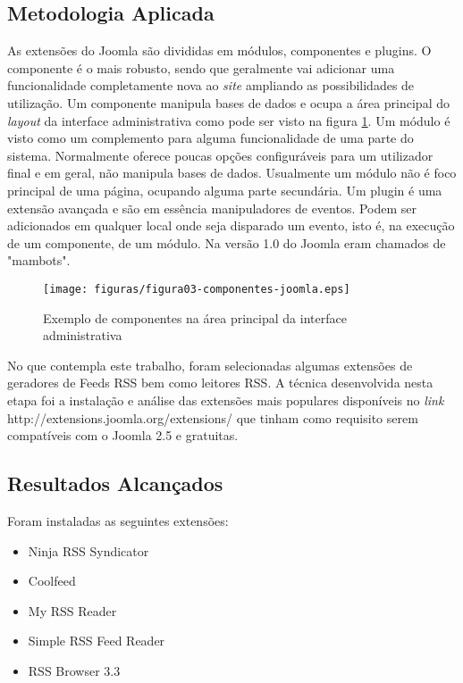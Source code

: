 \subsection{Metodologia Aplicada}
As extensões do Joomla são divididas em módulos, componentes e plugins. 
O componente é o mais robusto, sendo que geralmente vai adicionar uma funcionalidade completamente nova ao \emph{site} ampliando as possibilidades de utilização. Um componente manipula bases de dados e ocupa a área principal do \emph{layout} da interface administrativa como pode ser visto na figura \ref{fig:JOOMLA}.
Um módulo é visto como um complemento para alguma funcionalidade de uma parte do sistema. Normalmente oferece poucas opções configuráveis para um utilizador final e em geral, não manipula bases de dados. Usualmente um módulo não é foco principal de uma página, ocupando alguma parte secundária. 
Um plugin é uma extensão avançada e são em essência manipuladores de eventos. Podem ser adicionados em qualquer local onde seja disparado um evento, isto é, na execução de um componente, de um módulo. Na versão 1.0 do Joomla eram chamados de "mambots". \cite{DocsJoomla}
\begin{figure}[hbtn]
   \centering
   \texttt{[image: figuras/figura03-componentes-joomla.eps]}
   \caption{Exemplo de componentes na área principal da interface administrativa}
   \label{fig:JOOMLA}
\end{figure}

No que contempla este trabalho, foram selecionadas algumas extensões de geradores de Feeds RSS bem como leitores RSS. 
A técnica desenvolvida nesta etapa foi a instalação e análise das extensões mais populares disponíveis no \emph{link} http://extensions.joomla.org/extensions/ que tinham como requisito serem compatíveis com o Joomla 2.5 e gratuitas.

\subsection{Resultados Alcançados}
Foram instaladas as seguintes extensões:
\begin{itemize}
   \item Ninja RSS Syndicator
   \item Coolfeed 
   \item My RSS Reader
   \item Simple RSS Feed Reader
   \item RSS Browser 3.3
\end{itemize}


